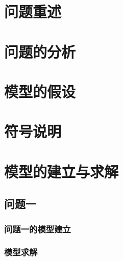 \documentclass{../../../Template/cumcmthesis-2025} %
\title{} %
\begin{document}
\maketitle



\section{问题重述}





\section{问题的分析}





\section{模型的假设}





\section{符号说明}


\section{模型的建立与求解}

\subsection{问题一}

\subsubsection{问题一的模型建立}



\subsubsection{模型求解}


\end{document}

